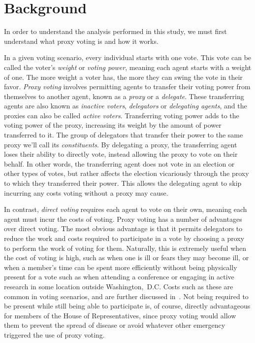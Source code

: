 \section{Background}\label{sec:background}
In order to understand the analysis performed in this study, we must first understand
what proxy voting is and how it works.

In a given voting scenario, every individual starts with one vote.
This vote can be called the voter's \textit{weight} or \textit{voting power}, meaning
each agent starts with a weight of one.
The more weight a voter has, the more they can swing the vote in their favor.
\textit{Proxy voting} involves permitting agents to transfer their voting power
from themselves to another agent, known as a \textit{proxy} or a \textit{delegate}.
These transferring agents are also known as \textit{inactive voters},
\textit{delegators} or \textit{delegating agents}, and the proxies can also be called
\textit{active voters}.
Transferring voting power adds to the voting power of the proxy, increasing its
weight by the amount of power transferred to it.
The group of delegators that transfer their power to the same proxy we'll call its
\textit{constituents}.
By delegating a proxy, the transferring agent loses their ability to directly vote,
instead allowing the proxy to vote on their behalf.
In other words, the transferring agent does not vote in an election or other types of
votes, but rather affects the election vicariously through the proxy to which they
transferred their power.
This allows the delegating agent to skip incurring any costs voting without a proxy
may cause.

In contrast, \textit{direct voting} requires each agent to vote on their own, meaning
each agent must incur the costs of voting.
Proxy voting has a number of advantages over direct voting.
The most obvious advantage is that it permits delegators to reduce the work and costs
required to participate in a vote by choosing a proxy to perform the work of voting
for them.
Naturally, this is extremely useful when the cost of voting is high, such as
when one is ill or fears they may become ill, or when a member's time can be spent
more efficiently without being physically present for a vote such as when attending a
conference or engaging in active research in some location outside {Washington,~D.C}.
Costs such as these are common in voting scenarios, and are further discussed
in~\cite{Gershtein2019}.
Not being required to be present while still being able to participate is, of course,
directly advantageous for members of the House of Representatives, since proxy voting
would allow them to prevent the spread of disease or avoid whatever other emergency
triggered the use of proxy voting.

